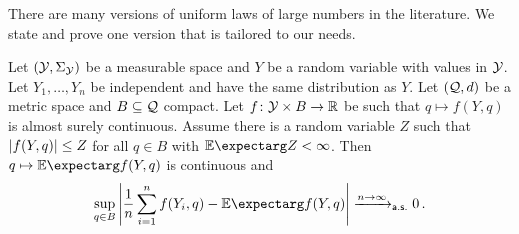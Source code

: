 There are many versions of uniform laws of large numbers in the literature. We state and prove one version that is tailored to our needs.
\begin{theorem}\label{thm:ULLN}
Let $(\mathcal{Y}, \Sigma_{\mathcal{Y}})$ be a measurable space and $Y$ be a random variable with values in $\mathcal{Y}$. Let $Y_1, \dots, Y_n$ be independent and have the same distribution as $Y$.
Let $(\mathcal{Q}, d)$ be a metric space and $B\subseteq \mathcal{Q}$ compact. 
Let $f \colon \mathcal{Y} \times B \to \mathbb{R}$ be such that $q \mapsto f(Y, q)$  is almost surely continuous. Assume there is a random variable $Z$ such that $\left| f(Y, q) \right| \leq Z$ for all $q \in B$ with $\Ex{Z} < \infty$. Then $q \mapsto \Ex{f(Y, q)}$ is continuous and 
\begin{equation*}
	\sup_{q\in B} \abs{\frac 1n \sum_{i=1}^n f(Y_i, q) - \Ex{f(Y, q)}} \xrightarrow{n\to\infty}_{\ms{a.s.}} 0 
	\eqfs
\end{equation*}
\end{theorem}
%
